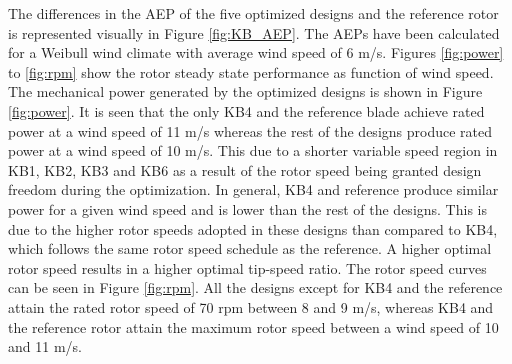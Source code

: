 \begin{table}[pht]
\centering
\caption{Summary of overall properties of the five optimized blades.}
\label{tab:overall_summary}
\end{table}
The differences in the AEP of the five optimized designs and the reference rotor is represented visually in Figure \ref{fig:KB_AEP}. The AEPs have been calculated for a Weibull wind climate with average wind speed of 6 m/s.
Figures \ref{fig:power} to \ref{fig:rpm} show the rotor steady state performance as function of wind speed. The mechanical power generated by the optimized designs is shown in Figure \ref{fig:power}. It is seen that the only KB4 and the reference blade achieve rated power at a wind speed of 11 m/s whereas the rest of the designs produce rated power at a wind speed of 10 m/s. This due to a shorter variable speed region in KB1, KB2, KB3 and KB6 as a result of the rotor speed being granted design freedom during the optimization. In general, KB4 and reference produce similar power for a given wind speed and is lower than the rest of the designs. This is due to the higher rotor speeds adopted in these designs than compared to KB4, which follows the same rotor speed schedule as the reference. A higher optimal rotor speed results in a higher optimal tip-speed ratio. The rotor speed curves can be seen in Figure \ref{fig:rpm}. All the designs except for KB4 and the reference attain the rated rotor speed of 70 rpm between 8 and 9 m/s, whereas KB4 and the reference rotor attain the maximum rotor speed between a wind speed of 10 and 11 m/s. 

